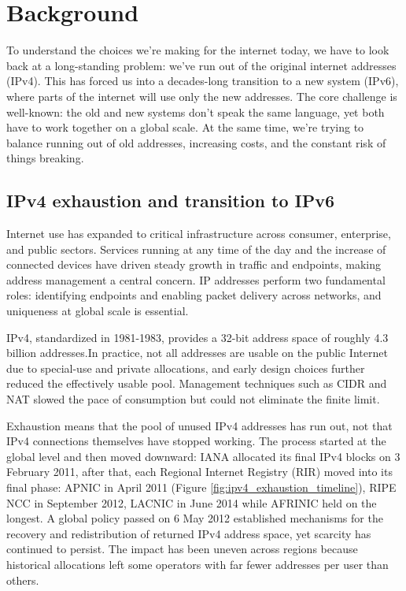\chapter{Background}
To understand the choices we're making for the internet today, we have to look back at a long-standing problem: we've run out of the original internet addresses (IPv4). This has forced us into a decades-long transition to a new system (IPv6), where parts of the internet will use only the new addresses. The core challenge is well-known: the old and new systems don't speak the same language, yet both have to work together on a global scale. At the same time, we’re trying to balance running out of old addresses, increasing costs, and the constant risk of things breaking\cite{7737362,LEVIN20141059}.

\section{IPv4 exhaustion and transition to IPv6}
Internet use has expanded to critical infrastructure across consumer, enterprise, and public sectors. Services running at any time of the day and the increase of connected devices have driven steady growth in traffic and endpoints, making address management a central concern\cite{7737362,LEVIN20141059}. IP addresses perform two fundamental roles: identifying endpoints and enabling packet delivery across networks, and uniqueness at global scale is essential\cite{LEVIN20141059}.

IPv4, standardized in 1981-1983, provides a 32-bit address space of roughly 4.3 billion addresses\cite{rfc791}.In practice, not all addresses are usable on the public Internet due to special-use and private allocations, and early design choices further reduced the effectively usable pool\cite{rfc1918,7737362,LEVIN20141059}. Management techniques such as CIDR and NAT slowed the pace of consumption but could not eliminate the finite limit\cite{7737362}.

Exhaustion means that the pool of unused IPv4 addresses has run out, not that IPv4 connections themselves have stopped working. The process started at the global level and then moved downward: IANA allocated its final IPv4 blocks on 3 February 2011, after that, each Regional Internet Registry (RIR) moved into its final phase: APNIC in April 2011 (Figure \ref{fig:ipv4_exhaustion_timeline}), RIPE NCC in September 2012, LACNIC in June 2014 while AFRINIC held on the longest\cite{LEVIN20141059}. A global policy passed on 6 May 2012 established mechanisms for the recovery and redistribution of returned IPv4 address space, yet scarcity has continued to persist\cite{7737362}. The impact has been uneven across regions because historical allocations left some operators with far fewer addresses per user than others\cite{LEVIN20141059}.

